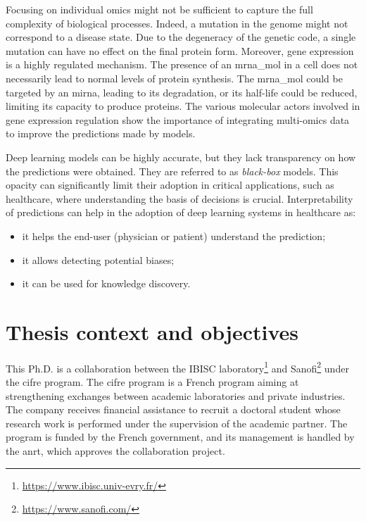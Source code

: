 \documentclass[../main.tex]{subfiles}
\begin{document}
	Focusing on individual omics might not be sufficient to capture the full complexity of biological processes.
	Indeed, a mutation in the genome might not correspond to a disease state.
	Due to the degeneracy of the genetic code, a single mutation can have no effect on the final protein form.
	Moreover, gene expression is a highly regulated mechanism.
	The presence of an \gls{mrna_mol} in a cell does not necessarily lead to normal levels of protein synthesis.
	The \gls{mrna_mol} could be targeted by an \gls{mirna}, leading to its degradation, or its half-life could be reduced, limiting its capacity to produce proteins.
	The various molecular actors involved in gene expression regulation show the importance of integrating multi-omics data to improve the predictions made by models.

	Deep learning models can be highly accurate, but they lack transparency on how the predictions were obtained.
	They are referred to as \emph{black-box} models.
	This opacity can significantly limit their adoption in critical applications, such as healthcare,  where understanding the basis of decisions is crucial.
	Interpretability of predictions can help in the adoption of deep learning systems in healthcare as:
	\begin{itemize}[nosep]
		\item it helps the end-user (physician or patient) understand the prediction;
		\item it allows detecting potential biases;
		\item it can be used for knowledge discovery.
	\end{itemize}

\section{Thesis context and objectives}
	This Ph.D. is a collaboration between the IBISC laboratory\footnote{\url{https://www.ibisc.univ-evry.fr/}} and Sanofi\footnote{\url{https://www.sanofi.com/}} under the \gls{cifre} program.
	The \gls{cifre} program is a French program aiming at strengthening exchanges between academic laboratories and private industries.
	The company receives financial assistance to recruit a doctoral student whose research work is performed under the supervision of the academic partner.
	The program is funded by the French government, and its management is handled by the \gls{anrt}, which approves the collaboration project.
\end{document}
